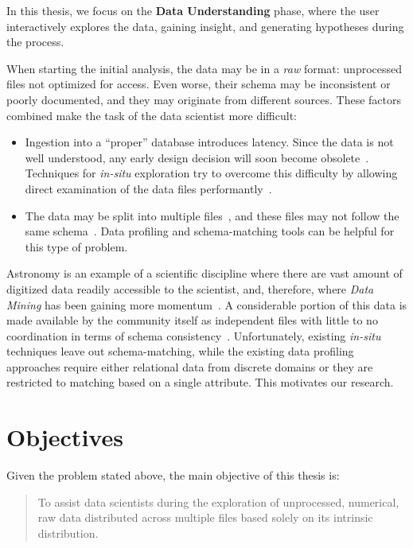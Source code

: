 In this thesis, we focus on the \textbf{Data Understanding} phase, where the user interactively
explores the data, gaining insight, and generating hypotheses during the process.

When starting the initial analysis, the data may be in a \emph{raw} format: unprocessed files not 
optimized for access. Even worse, their schema may be inconsistent or poorly documented, and they may
originate from different sources. These factors combined make the task of the data scientist more
difficult:

\begin{itemize}
    \item Ingestion into a ``proper'' database introduces latency. Since the data is not well
        understood, any early design decision will soon become obsolete~\cite{Kersten2011}.
        Techniques for \emph{in-situ} exploration try to overcome this difficulty
        by allowing direct examination of the data files performantly~\cite{Idreos2011}.
    \item The data may be split into multiple files~\cite{Baud2012}, and these files may not
        follow the same schema~\cite{Alawini2014}. Data profiling and schema-matching tools
        can be helpful for this type of problem.
\end{itemize}

Astronomy is an example of a scientific discipline where there are vast amount of digitized data
readily accessible to the scientist, and, therefore, where \emph{Data Mining} has been gaining
more momentum~\cite{Ball2010}. A considerable portion of this data is made available by the community
itself as independent files with little to no coordination in terms of schema consistency~\cite{Pepe2014}.
Unfortunately, existing \emph{in-situ} techniques leave out schema-matching, while the existing
data profiling approaches require either relational data from discrete domains or they are restricted to matching based on a single attribute. This motivates our
research.

\section{Objectives}
\label{sec:main_objective}

Given the problem stated above, the main objective of this
thesis is:

\begin{quote}
    To assist data scientists during the exploration of 
    unprocessed, numerical, raw data distributed across
    multiple files based solely on its intrinsic distribution.
\end{quote}


